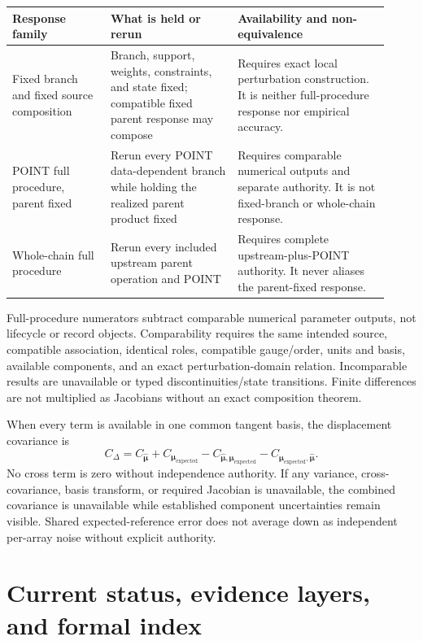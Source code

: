 \documentclass[12pt]{article}
\newcommand{\muhat}{\widehat{\boldsymbol{\mu}}}
\newcommand{\muexp}{\boldsymbol{\mu}_{\mathrm{expected}}}
\begin{document}
\begin{longtable}{@{}P{0.24\linewidth}P{0.31\linewidth}P{0.37\linewidth}@{}}
\toprule
Response family & What is held or rerun & Availability and non-equivalence \\
\midrule
\endhead
Fixed branch and fixed source composition & Branch, support, weights, constraints, and state fixed; compatible fixed parent response may compose & Requires exact local perturbation construction. It is neither full-procedure response nor empirical accuracy. \\
POINT full procedure, parent fixed & Rerun every POINT data-dependent branch while holding the realized parent product fixed & Requires comparable numerical outputs and separate authority. It is not fixed-branch or whole-chain response. \\
Whole-chain full procedure & Rerun every included upstream parent operation and POINT & Requires complete upstream-plus-POINT authority. It never aliases the parent-fixed response. \\
\bottomrule
\end{longtable}

Full-procedure numerators subtract comparable numerical parameter outputs, not
lifecycle or record objects. Comparability requires the same intended source,
compatible association, identical roles, compatible gauge/order, units and
basis, available components, and an exact perturbation-domain relation.
Incomparable results are unavailable or typed discontinuities/state
transitions. Finite differences are not multiplied as Jacobians without an
exact composition theorem.

When every term is available in one common tangent basis, the displacement
covariance is
\begin{equation}
C_{\Delta}=C_{\muhat}+C_{\muexp}
-C_{\muhat,\muexp}-C_{\muexp,\muhat}.
\end{equation}
No cross term is zero without independence authority. If any variance,
cross-covariance, basis transform, or required Jacobian is unavailable, the
combined covariance is unavailable while established component uncertainties
remain visible. Shared expected-reference error does not average down as
independent per-array noise without explicit authority.

\section{Current status, evidence layers, and formal index}
\end{document}
